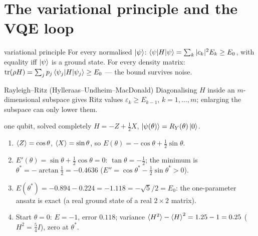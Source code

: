 \documentclass[11pt,a4paper,openany]{book}
\newcounter{wex}[chapter]
\newenvironment{steps}{\begin{enumerate}[label=\textbf{Step \arabic*.}, leftmargin=4.2em, itemsep=2pt]}{\end{enumerate}}
\newcommand{\bt}{\boldsymbol\theta}
\begin{document}
\section{The variational principle and the VQE loop}
\begin{keyres}{variational principle}
For every normalised $\ket\psi$: $\braket{\psi|H|\psi} = \sum_k|c_k|^2E_k \ge E_0$, with equality iff $\ket\psi$ is a ground state. For every density matrix:
$\operatorname{tr}(\rho H) = \sum_jp_j\braket{\psi_j|H|\psi_j} \ge E_0$ --- the bound survives noise.
\end{keyres}
\begin{keyres}{Rayleigh--Ritz (Hylleraas--Undheim--MacDonald)}
Diagonalising $H$ inside an $m$-dimensional subspace gives Ritz values $\varepsilon_k \ge E_{k-1}$, $k = 1, \dots, m$; enlarging the subspace can only lower them.
\end{keyres}
\begin{center}
\end{center}
\begin{wexample}{one qubit, solved completely}
$H = -Z + \tfrac12X$, $\ket{\psi(\theta)} = R_Y(\theta)\ket0$.
\begin{steps}
\item $\braket Z = \cos\theta$, $\braket X = \sin\theta$, so $E(\theta) = -\cos\theta + \tfrac12\sin\theta$.
\item $E'(\theta) = \sin\theta + \tfrac12\cos\theta = 0$: $\tan\theta = -\tfrac12$; the minimum is $\theta^* = -\arctan\tfrac12 = -0.4636$ ($E'' = \cos\theta^* - \tfrac12\sin\theta^* > 0$).
\item $E(\theta^*) = -0.894 - 0.224 = -1.118 = -\sqrt5/2 = E_0$: the one-parameter ansatz is exact (a real ground state of a real $2\times2$ matrix).
\item Start $\theta = 0$: $E = -1$, error $0.118$; variance $\braket{H^2} - \braket H^2 = 1.25 - 1 = 0.25$ ($H^2 = \tfrac54I$), zero at $\theta^*$.
\end{steps}
\end{wexample}
\end{document}
